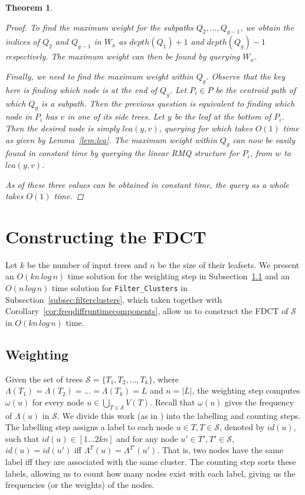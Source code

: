 \documentclass{article}
\newcommand{\leafset}{\Lambda}
\newcommand{\weight}{\omega}
\newtheorem{rmqquery}[incompatibility]{Theorem}
\begin{document}
\begin{rmqquery}
\begin{proof}
            To find the maximum weight for the subpaths $Q_2, ..., Q_{g - 1}$, we obtain the indices of $Q_2$ and $Q_{g-1}$ in $W_x$ as $depth(Q_1) + 1$ and $depth(Q_g) - 1$ respectively. The maximum weight can then be found by querying $W_x$.

            Finally, we need to find the maximum weight within $Q_g$. Observe that the key here is finding which node is at the end of $Q_g$. Let $P_i \in P$ be the centroid path of which $Q_g$ is a subpath. Then the previous question is equivalent to finding which node in $P_i$ has $v$ in one of its side trees. Let $y$ be the leaf at the bottom of $P_i$. Then the desired node is simply $lca(y, v)$, querying for which takes $O(1)$ time as given by Lemma~\ref{lem:lca}. The maximum weight within $Q_g$ can now be easily found in constant time by querying the linear RMQ structure for $P_i$, from $w$ to $lca(y, v)$.

            As of these three values can be obtained in constant time, the query as a whole takes $O(1)$ time.
        \end{proof}
    \end{rmqquery}

    \section{Constructing the FDCT}
    \label{sec:freqdiffconstruction}

    Let $k$ be the number of input trees and $n$ be the size of their leafsets. We present an $O(kn\,log\,n)$ time solution for the weighting step in Subsection~\ref{subsec:weighting} and an $O(n\,log\,n)$ time solution for \texttt{Filter\_Clusters} in Subsection~\ref{subsec:filterclusters}, which taken together with Corollary~\ref{cor:freqdiffruntimecomponents}, allow us to construct the FDCT of $\mathcal{S}$ in $O(kn\,log\,n)$ time.

    \subsection{Weighting}
    \label{subsec:weighting}

    Given the set of trees $\mathcal{S} = \{T_1, T_2, ..., T_k\}$, where $\leafset(T_1) = \leafset(T_2) = ... = \leafset(T_k) = L$ and $n = |L|$, the weighting step computes $\weight(u)$ for every node $u \in \bigcup_{T \in \mathcal{S}}V(T)$. Recall that $\weight(u)$ gives the frequency of $\leafset(u)$ in $\mathcal{S}$. We divide this work (as in \cite{gawrychowski2017faster}) into the labelling and counting steps. The labelling step assigns a label to each node $u \in T, T \in \mathcal{S}$, denoted by $id(u)$, such that $id(u) \in [1 ... 2kn]$ and for any node $u' \in T', T' \in \mathcal{S}$, $id(u) = id(u')$ iff $\leafset^T(u) = \leafset^{T'}(u')$. That is, two nodes have the same label iff they are associated with the same cluster. The counting step sorts these labels, allowing us to count how many nodes exist with each label, giving us the frequencies (or the weights) of the nodes.
\end{document}
